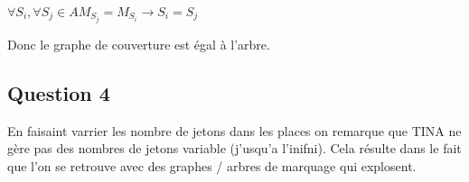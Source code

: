 $\forall S_i, \forall S_j \in A M_{S_j} = M_{S_i} \rightarrow S_i = S_j$

Donc le graphe de couverture est égal à l'arbre.

\subsection{Question 4}

En faisaint varrier les nombre de jetons dans les places on remarque que TINA ne gère pas des nombres de jetons variable (j'usqu'a l'inifni). Cela résulte dans le fait que l'on se retrouve avec des graphes / arbres de marquage qui explosent.


\newpage
